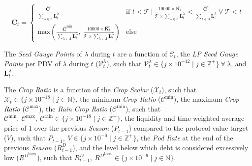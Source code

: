 \documentclass[tikz]{article}
\newcommand{\term}[1]{\textsl{#1}}
\newcommand{\Pinto}{} %
\begin{document}
    $$ 
        \mathbf{C}_{t} = 
        \begin{cases}
            \frac{\overline{\mathbf{C}}^{\circ}}
                {\sum\limits_{\lambda \in \Lambda}
                                            \mathbf{L}_{i}^{\lambda}}
                & \text{if } t < \mathscr{T}\ |\
                \frac{10000 \times \widehat{\mathbf{K}_{t}}}
                        {\mathscr{T} \times 
                            \sum\limits_{\lambda \in \Lambda}{\mathbf{L}_{t}^{\lambda}}}
                < \frac{\overline{\mathbf{C}}^{\circ}}
                    {\sum\limits_{\lambda \in \Lambda} 
                                                \mathbf{L}_{i}^{\lambda}}\ \forall\ \mathscr{T} < t \\
                
            \text{max}
            \left(\frac{\overline{\mathbf{C}}^{\text{min}}}
                    {\sum\limits_{\lambda \in \Lambda}
                                                \mathbf{L}_{i}^{\lambda}},\ 
            \frac{10000 \times \widehat{\mathbf{K}_{t}}}
                    {\mathscr{T} \times 
                        \sum\limits_{\lambda \in \Lambda}{\mathbf{L}_{t}^{\lambda}}}
            \right)
                & \text{else}
        \end{cases}
    $$

The \term{Seed Gauge Points} of $\lambda$ during $t$ are a function of $\mathscr{C}_{t}$, the \term{LP Seed Gauge Points} per PDV of $\lambda$ during $t$ ($\mathscr{V}_{t}^{\lambda}$), such that $\mathscr{V}_{t}^{\lambda} \in \{j \times 10^{-12} \mid j \in \mathbb{Z}^{+} \}\ \forall\ \lambda$, and $\mathbf{L}_{t}^{\lambda}$.

\newpage

The \term{Crop Ratio} is a function of the \term{Crop Scalar} ($\mathscr{X}_{t}$), such that $\mathscr{X}_{t} \in \{j \times 10^{-18} \mid j \in \mathbb{N} \}$, the minimum \term{Crop Ratio} ($\mathscr{C}^{\text{min}}$), the maximum \term{Crop Ratio} ($\mathscr{C}^{\text{max}}$), the \term{Rain} \term{Crop Ratio} ($\mathscr{C}^{\text{rain}}$), such that $\mathscr{C}^{\text{min}},\ \mathscr{C}^{\text{max}},\ \mathscr{C}^{\text{rain}} \in \{j \times 10^{-18} \mid j \in \mathbb{Z}^{+} \}$, the liquidity and time weighted average price of \Pinto1 over the previous \term{Season} ($P_{\overline{t-1}}$) compared to the protocol value target ($V$), such that $P_{\overline{t-1}},\ V \in \{j \times 10^{-6} \mid j \in \mathbb{Z}^{+} \}$, the \term{Pod Rate} at the end of the previous \term{Season} ($R_{t-1}^{D}$), and the level below which debt is considered excessively low ($R^{D^{\text{lower}}}$), such that $R_{t-1}^{D},\ R^{D^{\text{lower}}} \in \{j \times 10^{-6} \mid j \in \mathbb{N} \}$.
\end{document}
